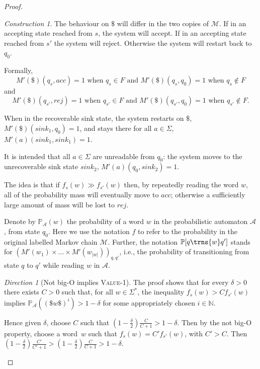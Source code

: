 \documentclass{lmcs}
\theoremstyle{plain}
\theoremstyle{definition}
\theoremstyle{remark}
\newtheorem{dir}{Direction}
\newtheorem{construction}[thm]{Construction}
\newcommand\acc{\mathit{acc}}
\newcommand\rej{\mathit{rej}}
\newcommand\sink{\mathit{sink}}
\newcommand\lmc{\mathcal{M}}
\newcommand\pr{\mathbb{P}}
\newcommand\pa{\mathcal{A}}
\renewcommand\nu{f}
\begin{document}
\begin{proof}
\begin{construction}
The behaviour on $\$$ will differ in the two copies of $\lmc$. If in an accepting state reached from $s$, the system will accept. If in an accepting state reached from $s'$ the system will reject. Otherwise the system will restart back to $q_0$.

Formally,
\[
M'(\$)(q_s,\acc) = 1 \text{ when } q_s\in F  \text{ and }  M'(\$)(q_s,q_0) = 1\text{ when } q_s\not\in F
\] and
\[
M'(\$)(q_{s'},\rej)= 1 \text{ when } q_{s'}\in F  \text{ and }  M'(\$)(q_{s'},q_0)= 1 \text{ when } q_{s'}\not\in F.
\]

When in the recoverable sink state, the system restarts on $\$$, $M'(\$)(\sink_1,q_0) = 1$, and stays there for all $a\in\Sigma$, $M'(a)(\sink_1,\sink_1) = 1$.

It is intended that all $a\in\Sigma$ are unreadable from $q_0$: the system moves to the unrecoverable sink state $\sink_2$, $M'(a)(q_0,\sink_2) = 1$.

The idea is that if $\nu_s(w) \gg \nu_{s'}(w)$ then, by repeatedly reading  the word $w$, all of the probability mass will eventually move to $\acc$; otherwise a sufficiently large amount of mass will be lost to $\rej$.

Denote by $\pr_\pa(w)$ the probability of a word $w$ in the probabilistic automaton $\pa$, from state $q_0$. Here we use the notation $\nu$ to refer to the probability in the original labelled Markov chain $\lmc$. Further, the notation $\pr[q \trns{w} q']$ stands for $\left(M'(w_1)\times \dots \times M'(w_{|w|})\right)_{q,q'}$, i.e., the probability of transitioning from state $q$ to $q'$ while reading $w$ in $\pa$.
\end{construction}

\begin{dir}[Not big-O implies \textsc{Value-1}]

The proof shows that for every $\delta>0$ there exists $C > 0$ such that, for all $w\in\Sigma^*$, the inequality $\nu_s(w) > C \nu_{s'}(w) $ implies $\pr_\pa((\$w\$)^i) > 1-\delta$ for some appropriately chosen $i \in \mathbb{N}$.

Hence given $\delta$,  choose $C$ such that $(1-\frac{\delta}{2})\frac{C}{C+1} > 1-\delta$. Then by the not big-O property, choose a word~$w$ such that $\nu_s(w) = C' \nu_{s'}(w)$, with $C' > C$. Then $(1-\frac{\delta}{2})\frac{C'}{C'+1} >(1-\frac{\delta}{2})\frac{C}{C+1} > 1-\delta$.


\end{dir}
\end{proof}
\end{document}
